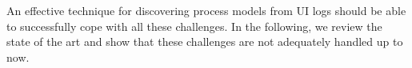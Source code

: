 


An effective technique for discovering process models from UI logs should be able to successfully cope with all these challenges. In the following, we review the state of the art and show that these challenges are not adequately handled up to now. 